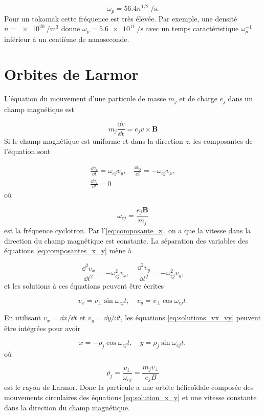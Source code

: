 \documentclass[main.tex]{subfiles}
\begin{document}
\[
	\omega_p = 56.4 n^{1/2} \SI{}{\per\second}.
\]
Pour un tokamak cette fréquence est très élevée. Par exemple, une densité \( n = \SI{e20}{\per\meter\cubed} \) donne \( \omega_p = \SI{5.6e11}{\per\second} \) avec un temps caractéristique \( \omega_p^{-1} \) inférieur à un centième de nanoseconde.

\section{Orbites de Larmor}
\label{sec:orbites_larmor}

L'équation du mouvement d'une particule de masse \( m_j \) et de charge \( e_j \) dans un champ magnétique est

\[
	m_j \frac{\dd v}{\dd t} = e_j v \times \bm{B}
\]
Si le champ magnétique est uniforme et dans la direction \( z \), les composantes de l'équation sont

\begin{align}
	\frac{\dd v_x}{\dd t} = \omega_{cj} v_y, \quad \frac{\dd v_y}{\dd t} = -\omega_{cj} v_x, \label{eq:composantes_x_y}\\
	\frac{\dd v_z}{\dd t} = 0 \label{eq:composante_z}
\end{align}
où

\[
	\omega_{cj} = \frac{e_j \bm{B}}{m_j}
\]
est la fréquence cyclotron.
Par l'\autoref{eq:composante_z}, on a que la vitesse dans la direction du champ magnétique est constante.
La séparation des variables des équations \ref{eq:composantes_x_y} mène à

\[
	\frac{\dd^2 v_x}{\dd t^2} = -\omega_{cj}^2 v_x, \quad \frac{\dd^2 v_y}{\dd t^2} = -\omega_{cj}^2 v_y,
\]
et les solutions à ces équations peuvent être écrites

\begin{equation}
	v_x = v_\perp \sin \omega_{cj} t, \quad v_y = v_\perp \cos \omega_{cj} t.
	\label{eq:solutions_vx_vy}
\end{equation}

En utilisant \( v_x = \dd x / \dd t \) et \( v_y = \dd y / \dd t \), les équations \ref{eq:solutions_vx_vy} peuvent être intégrées pour avoir

\begin{equation}
	x = - \rho_j \cos \omega_{cj} t, \quad y = \rho_j \sin \omega_{cj} t,
	\label{eq:solution_x_y}
\end{equation}
où

\[
	\rho_j = \frac{v_\perp}{\omega_{cj}} = \frac{m_j v_\perp}{e_j B}
\]
est le rayon de Larmor.
Donc la particule a une orbite hélicoïdale composée des mouvements circulaires des équations \ref{eq:solution_x_y} et une vitesse constante dans la direction du champ magnétique.
\end{document}
